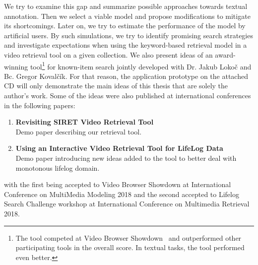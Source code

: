 We try to examine this gap and summarize possible approaches towards textual annotation. Then we select a viable model and propose modifications to mitigate its shortcomings. Later on, we try to estimate the performance of the model by artificial users. By such simulations, we try to identify promising search strategies and investigate expectations when using the keyword-based retrieval model in a video retrieval tool on a given collection. We also present ideas of an award-winning tool\footnote{The tool competed at Video Browser Showdown~\cite{cobarzan2017interactive} and outperformed other participating tools in the overall score. In textual tasks, the tool performed even better.} for known-item search jointly developed with Dr. Jakub Lokoč and Bc. Gregor Kovalčík. For that reason, the application prototype on the attached CD will only demonstrate the main ideas of this thesis that are solely the author's work. Some of the ideas were also published at international conferences in the following papers:
\begin{enumerate}
	\item \textbf{Revisiting SIRET Video Retrieval Tool}~\cite{lokovc2018revisiting}\\
	Demo paper describing our retrieval tool.
	\item \textbf{Using an Interactive Video Retrieval Tool for LifeLog Data}~\cite{LokocLSC}\\
	Demo paper introducing new ideas added to the tool to better deal with monotonous lifelog domain.
\end{enumerate}
with the first being accepted to Video Browser Showdown at International Conference on MultiMedia Modeling 2018 and the second accepted to Lifelog Search Challenge workshop at International Conference on Multimedia Retrieval 2018.
